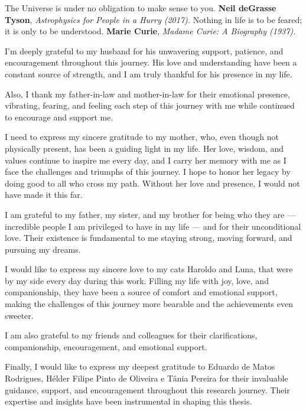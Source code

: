 
\quotepage
{The Universe is under no obligation to make sense to you.}
{\textbf{Neil deGrasse Tyson}, \textit{Astrophysics for People in a Hurry (2017).}}
{Nothing in life is to be feared; it is only to be understood.}
{\textbf{Marie Curie}, \textit{Madame Curie: A Biography (1937).}}



\begin{acknowledgements}

I'm deeply grateful to my husband for his unwavering support, patience, and encouragement throughout this journey. His love and understanding have been a constant source of strength, and I am truly thankful for his presence in my life.

Also, I thank my father-in-law and mother-in-law for their emotional presence, vibrating, fearing, and feeling each step of this journey with me while continued to encourage and support me.

I need to express my sincere gratitude to my mother, who, even though not physically present, has been a guiding light in my life. Her love, wisdom, and values continue to inspire me every day, and I carry her memory with me as I face the challenges and triumphs of this journey. I hope to honor her legacy by doing good to all who cross my path. Without her love and presence, I would not have made it this far.

I am grateful to my father, my sister, and my brother for being who they are — incredible people I am privileged to have in my life — and for their unconditional love. Their existence is fundamental to me staying strong, moving forward, and pursuing my dreams.

I would like to express my sincere love to my cats Haroldo and Luna, that were by my side every day during this work. Filling my life with joy, love, and companionship, they have been a source of comfort and emotional support, making the challenges of this journey more bearable and the achievements even sweeter.

I am also grateful to my friends and colleagues for their clarifications, companionship, encouragement, and emotional support.

Finally, I would like to express my deepest gratitude to Eduardo de Matos Rodrigues, Hélder Filipe Pinto de Oliveira e Tânia Pereira for their invaluable guidance, support, and encouragement throughout this research journey. Their expertise and insights have been instrumental in shaping this thesis. 


\end{acknowledgements}

